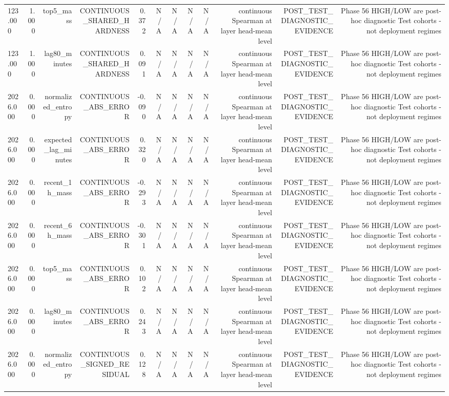 \begin{table}[h!]
\begin{tabular}{lrrrrrrrrrrr}
123.000 & 1.000 & top5\_mass & CONTINUOUS\_SHARED\_HARDNESS & 0.372 & N/A & N/A & N/A & N/A & continuous Spearman at layer head-mean level & POST\_TEST\_DIAGNOSTIC\_EVIDENCE & Phase 56 HIGH/LOW are post-hoc diagnostic Test cohorts - not deployment regimes \\
123.000 & 1.000 & lag80\_minutes & CONTINUOUS\_SHARED\_HARDNESS & 0.091 & N/A & N/A & N/A & N/A & continuous Spearman at layer head-mean level & POST\_TEST\_DIAGNOSTIC\_EVIDENCE & Phase 56 HIGH/LOW are post-hoc diagnostic Test cohorts - not deployment regimes \\
2026.000 & 0.000 & normalized\_entropy & CONTINUOUS\_ABS\_ERROR & -0.090 & N/A & N/A & N/A & N/A & continuous Spearman at layer head-mean level & POST\_TEST\_DIAGNOSTIC\_EVIDENCE & Phase 56 HIGH/LOW are post-hoc diagnostic Test cohorts - not deployment regimes \\
2026.000 & 0.000 & expected\_lag\_minutes & CONTINUOUS\_ABS\_ERROR & 0.320 & N/A & N/A & N/A & N/A & continuous Spearman at layer head-mean level & POST\_TEST\_DIAGNOSTIC\_EVIDENCE & Phase 56 HIGH/LOW are post-hoc diagnostic Test cohorts - not deployment regimes \\
2026.000 & 0.000 & recent\_1h\_mass & CONTINUOUS\_ABS\_ERROR & -0.293 & N/A & N/A & N/A & N/A & continuous Spearman at layer head-mean level & POST\_TEST\_DIAGNOSTIC\_EVIDENCE & Phase 56 HIGH/LOW are post-hoc diagnostic Test cohorts - not deployment regimes \\
2026.000 & 0.000 & recent\_6h\_mass & CONTINUOUS\_ABS\_ERROR & -0.301 & N/A & N/A & N/A & N/A & continuous Spearman at layer head-mean level & POST\_TEST\_DIAGNOSTIC\_EVIDENCE & Phase 56 HIGH/LOW are post-hoc diagnostic Test cohorts - not deployment regimes \\
2026.000 & 0.000 & top5\_mass & CONTINUOUS\_ABS\_ERROR & 0.102 & N/A & N/A & N/A & N/A & continuous Spearman at layer head-mean level & POST\_TEST\_DIAGNOSTIC\_EVIDENCE & Phase 56 HIGH/LOW are post-hoc diagnostic Test cohorts - not deployment regimes \\
2026.000 & 0.000 & lag80\_minutes & CONTINUOUS\_ABS\_ERROR & 0.243 & N/A & N/A & N/A & N/A & continuous Spearman at layer head-mean level & POST\_TEST\_DIAGNOSTIC\_EVIDENCE & Phase 56 HIGH/LOW are post-hoc diagnostic Test cohorts - not deployment regimes \\
2026.000 & 0.000 & normalized\_entropy & CONTINUOUS\_SIGNED\_RESIDUAL & 0.128 & N/A & N/A & N/A & N/A & continuous Spearman at layer head-mean level & POST\_TEST\_DIAGNOSTIC\_EVIDENCE & Phase 56 HIGH/LOW are post-hoc diagnostic Test cohorts - not deployment regimes \\

\end{tabular}
\end{table}
